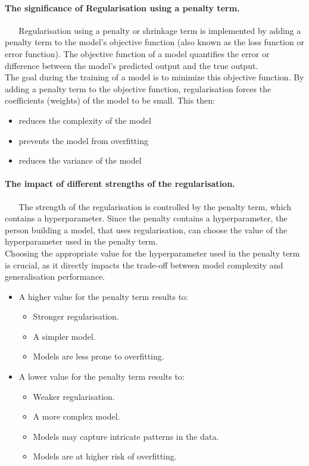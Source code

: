 \documentclass[12pt]{article}
\begin{document}
\paragraph{The significance of Regularisation using a penalty term.}~
\newline~
Regularisation using a penalty or shrinkage term is implemented by adding a penalty term to the model's objective function (also known as the loss function or error function).
The objective function of a model quantifies the error or difference between the model's predicted output and the true output.
\\ The goal during the training of a model is to minimize this objective function. By adding a penalty term to the objective function, regularisation forces the coefficients (weights) of the model to be small. This then:
\begin{itemize}
    \item reduces the complexity of the model
    \item prevents the model from overfitting
    \item reduces the variance of the model
\end{itemize} 

\paragraph{The impact of different strengths of the regularisation.}~
\newline~
The strength of the regularisation is controlled by the penalty term, which contains a hyperparameter. Since the penalty contains a hyperparameter, the person building a model,
that uses regularisation, can choose the value of the hyperparameter used in the penalty term. \\ Choosing the appropriate value for the hyperparameter used in the penalty term is crucial, as it directly impacts the trade-off
between model complexity and generalisation performance.
\begin{itemize}
    \item A higher value for the penalty term results to:
    \begin{itemize}
        \item Stronger regularisation.
        \item A simpler model.
        \item Models are less prone to overfitting.
    \end{itemize}
    \item A lower value for the penalty term results to:
    \begin{itemize}
        \item Weaker regularisation.
        \item A more complex model.
        \item Models may capture intricate patterns in the data.
        \item Models are at higher risk of overfitting.
    \end{itemize}
\end{itemize}
\end{document}

